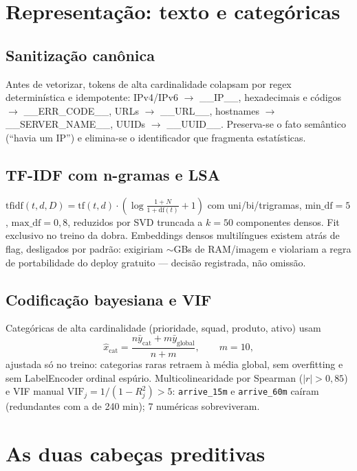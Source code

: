 \documentclass[11pt,a4paper]{article}
\begin{document}
\section{Representação: texto e categóricas}

\subsection{Sanitização canônica}
Antes de vetorizar, tokens de alta cardinalidade colapsam por regex
determinística e idempotente: IPv4/IPv6 $\to$ \_\_IP\_\_, hexadecimais e
códigos $\to$ \_\_ERR\_CODE\_\_, URLs $\to$ \_\_URL\_\_, hostnames $\to$
\_\_SERVER\_NAME\_\_, UUIDs $\to$ \_\_UUID\_\_. Preserva-se o fato semântico
(``havia um IP'') e elimina-se o identificador que fragmenta estatísticas.

\subsection{TF-IDF com n-gramas e LSA}
$\mathrm{tfidf}(t,d,D)=\mathrm{tf}(t,d)\cdot(\log\frac{1+N}{1+\mathrm{df}(t)}+1)$
com uni/bi/trigramas, $\mathrm{min\_df}=5$, $\mathrm{max\_df}=0{,}8$,
reduzidos por SVD truncada a $k=50$ componentes densos. Fit exclusivo no
treino da dobra. Embeddings densos multilíngues existem atrás de flag,
desligados por padrão: exigiriam $\sim$GBs de RAM/imagem e violariam a regra
de portabilidade do deploy gratuito --- decisão registrada, não omissão.

\subsection{Codificação bayesiana e VIF}
Categóricas de alta cardinalidade (prioridade, squad, produto, ativo) usam
\begin{equation}
\hat{x}_{\text{cat}}=\frac{n\bar{y}_{\text{cat}}+m\bar{y}_{\text{global}}}{n+m},
\qquad m=10,
\end{equation}
ajustada só no treino: categorias raras retraem à média global, sem
overfitting e sem LabelEncoder ordinal espúrio. Multicolinearidade por
Spearman ($|r|>0{,}85$) e VIF manual $\mathrm{VIF}_j=1/(1-R_j^2)>5$:
\texttt{arrive\_15m} e \texttt{arrive\_60m} caíram (redundantes com a de
240 min); 7 numéricas sobreviveram.

\section{As duas cabeças preditivas}
\end{document}
